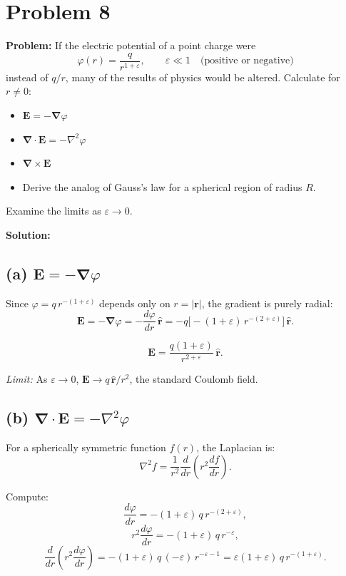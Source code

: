 \documentclass[12pt]{article}
\newcommand{\vect}[1]{\mathbf{#1}}
\newcommand{\grad}{\boldsymbol{\nabla}}
\begin{document}
\section*{Problem 8}

\textbf{Problem:} If the electric potential of a point charge were
\[
\varphi(r) = \frac{q}{r^{1+\varepsilon}}, \qquad \varepsilon \ll 1 \quad \text{(positive or negative)}
\]
instead of $q/r$, many of the results of physics would be altered. Calculate for $r \neq 0$:
\begin{itemize}
\item[(a)] $\vect{E} = -\grad\varphi$
\item[(b)] $\grad\cdot\vect{E} = -\nabla^2\varphi$
\item[(c)] $\grad\times\vect{E}$
\item[(d)] Derive the analog of Gauss's law for a spherical region of radius $R$.
\end{itemize}
Examine the limits as $\varepsilon \to 0$.

\bigskip
\textbf{Solution:}

\subsection*{(a) $\vect{E} = -\grad\varphi$}

Since $\varphi = q\,r^{-(1+\varepsilon)}$ depends only on $r = |\vect{r}|$, the gradient is purely radial:
\[
\vect{E} = -\grad\varphi = -\frac{d\varphi}{dr}\,\hat{\vect{r}} = -q\bigl[-(1+\varepsilon)\,r^{-(2+\varepsilon)}\bigr]\,\hat{\vect{r}}.
\]

\[
\boxed{\vect{E} = \frac{q(1+\varepsilon)}{r^{2+\varepsilon}}\,\hat{\vect{r}}}.
\]

\textit{Limit:} As $\varepsilon \to 0$, $\vect{E} \to q\,\hat{\vect{r}}/r^2$, the standard Coulomb field.

\subsection*{(b) $\grad\cdot\vect{E} = -\nabla^2\varphi$}

For a spherically symmetric function $f(r)$, the Laplacian is:
\[
\nabla^2 f = \frac{1}{r^2}\frac{d}{dr}\!\left(r^2\frac{df}{dr}\right).
\]

Compute:
\[
\frac{d\varphi}{dr} = -(1+\varepsilon)\,q\,r^{-(2+\varepsilon)},
\]
\[
r^2\frac{d\varphi}{dr} = -(1+\varepsilon)\,q\,r^{-\varepsilon},
\]
\[
\frac{d}{dr}\!\left(r^2\frac{d\varphi}{dr}\right) = -(1+\varepsilon)\,q\,(-\varepsilon)\,r^{-\varepsilon-1} = \varepsilon(1+\varepsilon)\,q\,r^{-(1+\varepsilon)}.
\]
\end{document}
